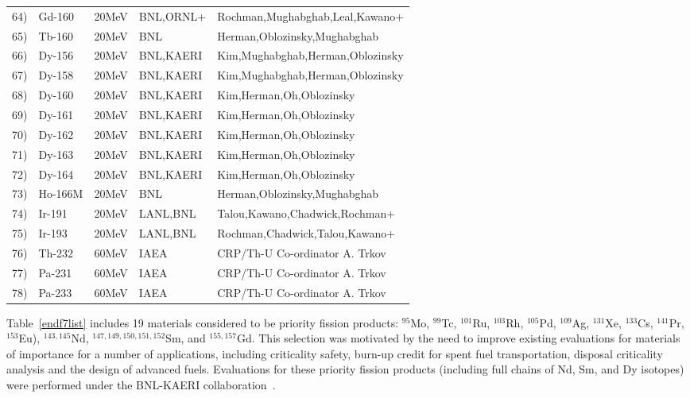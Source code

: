 \begin{longtable*}{lllll}
 64) &  Gd-160  &  20MeV   &  BNL,ORNL+  & Rochman,Mughabghab,Leal,Kawano+   \\
 65) &  Tb-160  &  20MeV   &  BNL        & Herman,Oblozinsky,Mughabghab      \\
 66) &  Dy-156  &  20MeV   &  BNL,KAERI  & Kim,Mughabghab,Herman,Oblozinsky  \\
 67) &  Dy-158  &  20MeV   &  BNL,KAERI  & Kim,Mughabghab,Herman,Oblozinsky  \\
 68) &  Dy-160  &  20MeV   &  BNL,KAERI  & Kim,Herman,Oh,Oblozinsky          \\
 69) &  Dy-161  &  20MeV   &  BNL,KAERI  & Kim,Herman,Oh,Oblozinsky          \\
 70) &  Dy-162  &  20MeV   &  BNL,KAERI  & Kim,Herman,Oh,Oblozinsky          \\
 71) &  Dy-163  &  20MeV   &  BNL,KAERI  & Kim,Herman,Oh,Oblozinsky          \\
 72) &  Dy-164  &  20MeV   &  BNL,KAERI  & Kim,Herman,Oh,Oblozinsky          \\
 73) &  Ho-166M &  20MeV   &  BNL        & Herman,Oblozinsky,Mughabghab      \\
 74) &  Ir-191  &  20MeV   &  LANL,BNL   & Talou,Kawano,Chadwick,Rochman+    \\
 75) &  Ir-193  &  20MeV   &  LANL,BNL   & Rochman,Chadwick,Talou,Kawano+    \\
 76) &  Th-232  &  60MeV   &  IAEA       & CRP/Th-U Co-ordinator A. Trkov    \\
 77) &  Pa-231  &  60MeV   &  IAEA       & CRP/Th-U Co-ordinator A. Trkov    \\
 78) &  Pa-233  &  60MeV   &  IAEA       & CRP/Th-U Co-ordinator A. Trkov    \\
\hline
\end{longtable*}

Table~\ref{endf7list} includes 19 materials considered to be
priority fission products: $^{95}$Mo, $^{99}$Tc, $^{101}$Ru, $^{103}$Rh, $%
^{105}$Pd, $^{109}$Ag, $^{131}$Xe, $^{133}$Cs, $^{141}$Pr, $^{153}$Eu), $%
^{143,145}$Nd, $^{147,149,150,151,152}$Sm, and $^{155,157}$Gd. This
selection was motivated by the need to improve existing evaluations for
materials of importance for a number of applications, including criticality
safety, burn-up credit for spent fuel transportation, disposal criticality
analysis and the design of advanced fuels. Evaluations for these priority
fission products (including full chains of Nd, Sm, and Dy isotopes) were
performed under the BNL-KAERI collaboration~\cite{Kim:07}.

